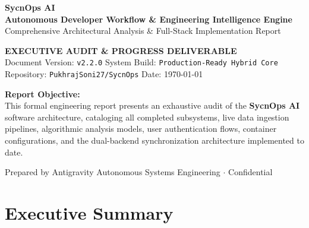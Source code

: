 \documentclass[11pt,a4paper]{article}
\begin{document}
\begin{titlepage}
    \centering
    \vspace*{1.5cm}
    
    {\Huge \bfseries \color{darkbg} SycnOps AI}\\[0.4cm]
    {\Large \bfseries \color{primary} Autonomous Developer Workflow \& Engineering Intelligence Engine}\\[0.2cm]
    {\normalsize \color{gray} Comprehensive Architectural Analysis \& Full-Stack Implementation Report}\\[1.5cm]
    
    \begin{tcolorbox}[colback=darkbg,colframe=primary,arc=3mm,width=0.92\textwidth]
        \centering\color{white}
        \vspace{0.2cm}
        \textbf{\large EXECUTIVE AUDIT \& PROGRESS DELIVERABLE}\\[0.15cm]
        \small Document Version: \texttt{v2.2.0} \quad\textbar\quad System Build: \texttt{Production-Ready Hybrid Core}\\
        Repository: \texttt{PukhrajSoni27/SycnOps} \quad\textbar\quad Date: \today
        \vspace{0.2cm}
    \end{tcolorbox}
    
    \vspace{2.0cm}
    
    \begin{minipage}{0.85\textwidth}
        \textbf{\color{darkbg}Report Objective:}\\
        This formal engineering report presents an exhaustive audit of the \textbf{SycnOps AI} software architecture, cataloging all completed subsystems, live data ingestion pipelines, algorithmic analysis models, user authentication flows, container configurations, and the dual-backend synchronization architecture implemented to date.
    \end{minipage}
    
    \vfill
    
    {\small \color{gray} Prepared by Antigravity Autonomous Systems Engineering $\cdot$ Confidential}
\end{titlepage}

\newpage
\tableofcontents
\newpage

\section{Executive Summary}
\end{document}
